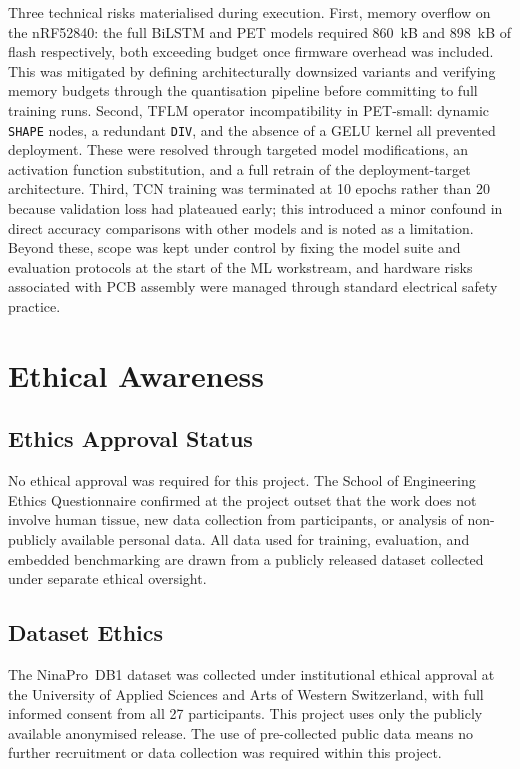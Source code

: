 \documentclass[11pt]{article}
\begin{document}
Three technical risks materialised during execution. First, memory overflow on the nRF52840: the full BiLSTM and PET models required 860~kB and 898~kB of flash respectively, both exceeding budget once firmware overhead was included. This was mitigated by defining architecturally downsized variants and verifying memory budgets through the quantisation pipeline before committing to full training runs. Second, TFLM operator incompatibility in PET-small: dynamic \texttt{SHAPE} nodes, a redundant \texttt{DIV}, and the absence of a GELU kernel all prevented deployment. These were resolved through targeted model modifications, an activation function substitution, and a full retrain of the deployment-target architecture. Third, TCN training was terminated at 10 epochs rather than 20 because validation loss had plateaued early; this introduced a minor confound in direct accuracy comparisons with other models and is noted as a limitation. Beyond these, scope was kept under control by fixing the model suite and evaluation protocols at the start of the ML workstream, and hardware risks associated with PCB assembly were managed through standard electrical safety practice.

\section{Ethical Awareness}
\label{sec:ethics}

\subsection{Ethics Approval Status}

No ethical approval was required for this project. The School of Engineering Ethics Questionnaire confirmed at the project outset that the work does not involve human tissue, new data collection from participants, or analysis of non-publicly available personal data. All data used for training, evaluation, and embedded benchmarking are drawn from a publicly released dataset collected under separate ethical oversight.

\subsection{Dataset Ethics}

The NinaPro~DB1 dataset was collected under institutional ethical approval at the University of Applied Sciences and Arts of Western Switzerland, with full informed consent from all 27 participants. This project uses only the publicly available anonymised release. The use of pre-collected public data means no further recruitment or data collection was required within this project.
\end{document}
